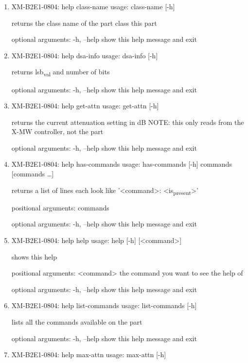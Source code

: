 \documentclass[11pt]{article}
\begin{document}
\begin{enumerate}
\item XM-B2E1-0804: help class-name
\label{sec:org7eabf0c}
usage: class-name [-h]

returns the class name of the part class this part

optional arguments:
  -h, --help  show this help message and exit

\item XM-B2E1-0804: help dsa-info
\label{sec:org2e9049b}
usage: dsa-info [-h]

returns lsb\textsubscript{val} and number of bits

optional arguments:
  -h, --help  show this help message and exit

\item XM-B2E1-0804: help get-attn
\label{sec:org85505a7}
usage: get-attn [-h]

returns the current attenuation setting in dB NOTE: this only reads from the
X-MW controller, not the part

optional arguments:
  -h, --help  show this help message and exit

\item XM-B2E1-0804: help has-commands
\label{sec:org95869de}
usage: has-commands [-h] commands [commands \ldots{}]

returns a list of lines each look like '<command>: <is\textsubscript{present}>'

positional arguments:
  commands

optional arguments:
  -h, --help  show this help message and exit

\item XM-B2E1-0804: help help
\label{sec:orgdd9974d}
usage: help [-h] [<command>]

shows this help

positional arguments:
  <command>   the command you want to see the help of

optional arguments:
  -h, --help  show this help message and exit

\item XM-B2E1-0804: help list-commands
\label{sec:org7247409}
usage: list-commands [-h]

lists all the commands available on the part

optional arguments:
  -h, --help  show this help message and exit

\item XM-B2E1-0804: help max-attn
\label{sec:orgaa53f42}
usage: max-attn [-h]


\end{enumerate}
\end{document}
